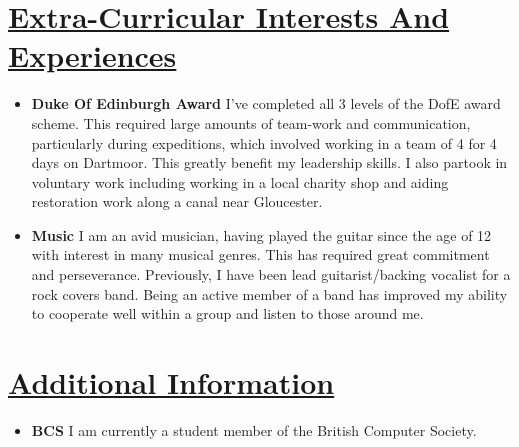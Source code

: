 \documentclass[11pt]{article}
\begin{document}
	\vspace{-20pt}
	\hspace{-100pt}\section*{\underline{Extra-Curricular Interests And Experiences}}
			\begin{itemize}
				\item \textbf{Duke Of Edinburgh Award} I've completed all 3 levels of the DofE award scheme. This required large amounts of team-work and communication, particularly during expeditions, which involved working in a team of 4 for 4 days on Dartmoor. This greatly benefit my leadership skills. I also partook in voluntary work including working in a local charity shop and aiding restoration work along a canal near Gloucester.
				\item \textbf{Music} I am an avid musician, having played the guitar since the age of 12 with interest in many musical genres. This has required great commitment and perseverance. Previously, I have been lead guitarist/backing vocalist for a rock covers band. Being an active member of a band has improved my ability to cooperate well within a group and listen to those around me. 
			\end{itemize}

	\vspace{-20pt}
	\hspace{-100pt}\section*{\underline{Additional Information}}
		\begin{itemize}
			\item \textbf{BCS} I am currently a student member of the British Computer Society.
		\end{itemize}
\end{document}
